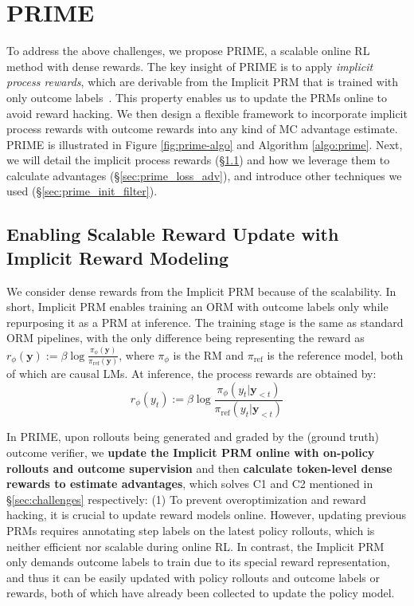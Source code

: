 \section{PRIME}


To address the above challenges, we propose PRIME, a scalable online RL method with dense rewards.
The key insight of PRIME is to apply \textit{implicit process rewards}, which are derivable from the Implicit PRM that is trained with only outcome labels~\citep{yuan2024freeprocessrewardsprocess}.
This property enables us to update the PRMs online to avoid reward hacking. 
We then design a flexible framework to incorporate implicit process rewards with outcome rewards into any kind of MC advantage estimate.
PRIME is illustrated in Figure \ref{fig:prime-algo} and Algorithm \ref{algo:prime}.
Next, we will detail the implicit process rewards (\S \ref{sec:prime_prm}) and how we leverage them to calculate advantages (\S \ref{sec:prime_loss_adv}), and introduce other techniques we used (\S \ref{sec:prime_init_filter}).



\subsection{Enabling Scalable Reward Update with Implicit Reward Modeling}
\label{sec:prime_prm}

We consider dense rewards from the Implicit PRM because of the scalability. 
In short, Implicit PRM enables training an ORM with outcome labels only while repurposing it as a PRM at inference. 
The training stage is the same as standard ORM pipelines, with the only difference being representing the reward as $r_\phi(\mathbf{y}):= \beta \log \frac{\pi_\phi(\mathbf{y})}{\pi_\text{ref}(\mathbf{y})}$, where $\pi_\phi$ is the RM and $\pi_\text{ref}$ is the reference model, both of which are causal LMs. At inference, the process rewards are obtained by:
\begin{equation}
\label{eq:pr}
    r_\phi(y_t) := \beta \log \frac{\pi_\phi(y_{t}|\mathbf{y}_{<t})}{\pi_\text{ref}(y_{t}|\mathbf{y}_{<t})}
\end{equation}



In PRIME, upon rollouts being generated and graded by the (ground truth) outcome verifier, we \textbf{update the Implicit PRM online with on-policy rollouts and outcome supervision} and then \textbf{calculate token-level dense rewards to estimate advantages}, which solves C1 and C2 mentioned in \S \ref{sec:challenges} respectively:
(1) To prevent overoptimization and reward hacking, it is crucial to update reward models online. However, updating previous PRMs \citep{Lightman2023LetsVS} requires annotating step labels on the latest policy rollouts, which is neither efficient nor scalable during online RL.
In contrast, the Implicit PRM only demands outcome labels to train due to its special reward representation, and thus it can be easily updated with policy rollouts and outcome labels or rewards, both of which have already been collected to update the policy model.


